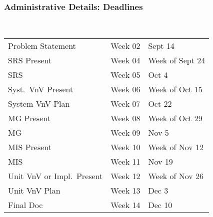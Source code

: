 \documentclass[t,12pt,numbers,fleqn]{beamer}
\begin{document}
\begin{frame}
\frametitle{Administrative Details: Deadlines}

~\newline
\begin{tabular}{l l l}
Problem Statement & Week 02 & Sept 14\\
SRS Present & Week 04 & Week of Sept 24\\
SRS & Week 05 & Oct 4\\
Syst.\ VnV Present & Week 06 & Week of Oct 15\\
System VnV Plan & Week 07 & Oct 22\\
MG Present & Week 08 & Week of Oct 29\\
MG & Week 09 & Nov 5\\
MIS Present & Week 10 & Week of Nov 12\\
MIS & Week 11 & Nov 19\\
Unit VnV or Impl.\ Present & Week 12 & Week of Nov 26\\
Unit VnV Plan & Week 13 & Dec 3\\
Final Doc & Week 14 & Dec 10\\
\end {tabular}

\end{frame}



\end{document}
